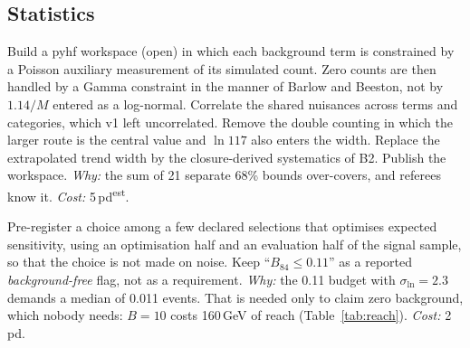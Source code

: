 \documentclass[11pt,a4paper]{article}
\newcommand{\EST}{\textsuperscript{\textsf{est}}}
\newcommand{\Bef}{B_{84}}
\newcommand{\must}{\textsf{\textbf{Must}}}
\begin{document}
\subsection{Statistics}
\begin{description}[leftmargin=0pt,style=unboxed]
\item[T1 \must{} A proper likelihood.] Build a pyhf workspace (open) in which each background term is constrained by a
  Poisson auxiliary measurement of its simulated count. Zero counts are then handled by a Gamma constraint in the manner
  of Barlow and Beeston, not by $1.14/M$ entered as a log-normal. Correlate the shared nuisances across terms and
  categories, which v1 left uncorrelated. Remove the double counting in which the larger route is the central value and
  $\ln 117$ also enters the width. Replace the extrapolated trend width by the closure-derived systematics of B2. Publish
  the workspace. \emph{Why:} the sum of 21 separate 68\% bounds over-covers, and referees know it. \emph{Cost:} 5\,pd\EST.
\item[T2 \must{} A new selection rule.] Pre-register a choice among a few declared selections that optimises expected
  sensitivity, using an optimisation half and an evaluation half of the signal sample, so that the choice is not made on
  noise. Keep ``$\Bef\le0.11$'' as a reported \emph{background-free} flag, not as a requirement. \emph{Why:} the 0.11
  budget with $\sigma_{\ln}=2.3$ demands a median of 0.011 events. That is needed only to claim zero background, which
  nobody needs: $B=10$ costs 160\,GeV of reach (Table~\ref{tab:reach}). \emph{Cost:} 2\,pd.
\end{description}
\end{document}
